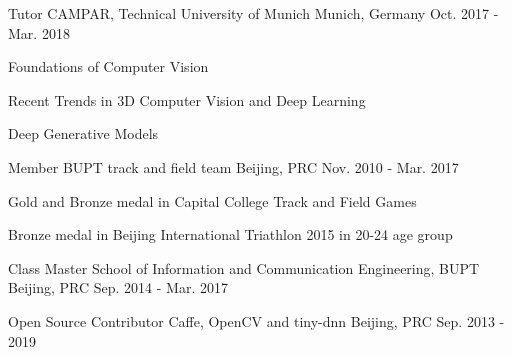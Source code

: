 


\begin{cventries}


\cventry
{Tutor} %
{CAMPAR, Technical University of Munich} %
{Munich, Germany} %
{Oct. 2017 - Mar. 2018} %
{ %
\begin{cvitems}
\item {Foundations of Computer Vision}
\item {Recent Trends in 3D Computer Vision and Deep Learning}
\item {Deep Generative Models}
\end{cvitems}
}

\cventry
{Member} %
{BUPT track and field team} %
{Beijing, PRC} %
{Nov. 2010 - Mar. 2017} %
{ %
\begin{cvitems}
\item {Gold and Bronze medal in Capital College Track and Field Games}
\item {Bronze medal in Beijing International Triathlon 2015 in 20-24 age group}
\end{cvitems}
}

\cventry
{Class Master} %
{School of Information and Communication Engineering, BUPT} %
{Beijing, PRC} %
{Sep. 2014 - Mar. 2017} %
{
}

\cventry
{Open Source Contributor} %
{Caffe, OpenCV and tiny-dnn} %
{Beijing, PRC} %
{Sep. 2013 - 2019} %
{
}


\end{cventries}
